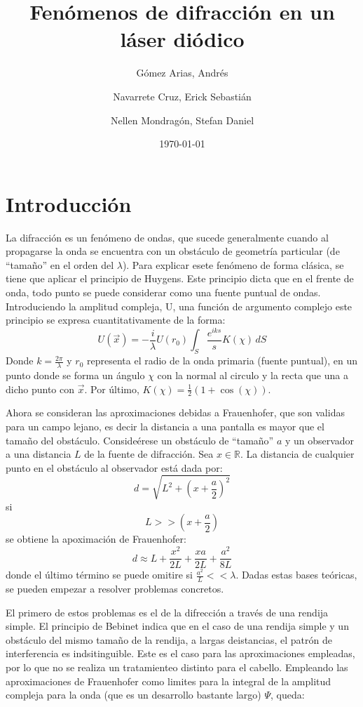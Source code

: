 \documentclass[12p]{article}
\title{Fenómenos de difracción en un láser diódico}
\author
{Gómez Arias, Andrés
\and
Navarrete Cruz, Erick Sebastián
\and 
Nellen Mondragón, Stefan Daniel
	}
\date{\today}
\begin{document}
\maketitle

\begin{abstract}
\noindent 
\end{abstract}

\section{Introducción}
\noindent La difracción es un fenómeno de ondas, que sucede generalmente cuando al propagarse la onda se encuentra con un obstáculo de geometría particular (de ``tamaño'' en el orden del $\lambda$). Para explicar esete fenómeno de forma clásica, se tiene que aplicar el principio de Huygens. Este principio dicta que en el frente de onda, todo punto se puede considerar como una fuente puntual de ondas. Introduciendo la amplitud compleja, U, una función de argumento complejo este principio se expresa cuantitativamente de la forma:
$$ U(\vec{x}) = -\frac{i}{\lambda} U(r_0) \int_{S} \frac {e^{iks}}{s} K(\chi)\,dS$$
Donde $k = \frac{2 \pi}{\lambda}$ y $r_0$ representa el radio de la onda primaria (fuente puntual), en un punto donde se forma un ángulo $\chi$ con la normal al circulo y la recta que una a dicho punto con $\vec{x}$. Por último, $K(\chi) = \frac{1}{2}(1 + \cos(\chi))$.
\par Ahora se consideran las aproximaciones debidas a Frauenhofer, que son validas para un campo lejano, es decir la distancia a una pantalla es mayor que el tamaño del obstáculo. Consideérese un obstáculo de ``tamaño'' $a$ y un observador a una distancia $L$ de la fuente de difracción. Sea $x \in \mathbb{R}$. La distancia de cualquier punto en el obstáculo al observador está dada por:
$$d = \sqrt{L^2 + (x + \frac{a}{2})^2}$$
si $$L >> (x + \frac{a}{2})$$ se obtiene la apoximación de Frauenhofer:
$$d \approx L + \frac{x^2}{2L}+\frac{x a}{2L}+\frac{a^2}{8L}$$
donde el último término se puede omitire si $\frac{a^2}{L} << \lambda$.
Dadas estas bases teóricas, se pueden empezar a resolver problemas concretos.
\par El primero de estos problemas es el de la difrección a través de una rendija simple. El principio de Bebinet indica que en el caso de una rendija simple y un obstáculo del mismo tamaño de la rendija, a largas deistancias, el patrón de interferencia es indsitinguible. Este es el caso para las aproximaciones empleadas, por lo que no se realiza un tratamienteo distinto para el cabello. Empleando las aproximaciones de Frauenhofer como limites para la integral de la amplitud compleja para la onda (que es un desarrollo bastante largo) $\Psi$, queda:
\end{document}
